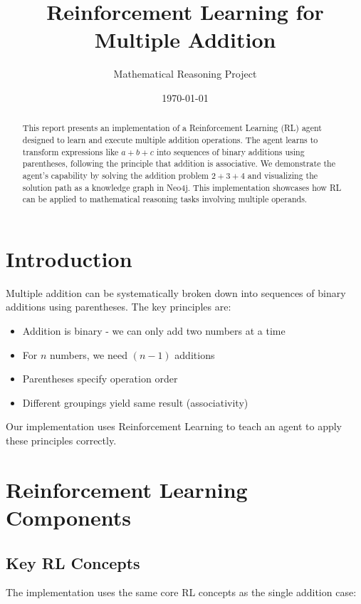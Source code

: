 \documentclass{article}
\title{Reinforcement Learning for Multiple Addition}
\author{Mathematical Reasoning Project}
\date{\today}
\begin{document}
\maketitle

\begin{abstract}
    This report presents an implementation of a Reinforcement Learning (RL) agent designed to learn and execute multiple addition operations. The agent learns to transform expressions like $a + b + c$ into sequences of binary additions using parentheses, following the principle that addition is associative. We demonstrate the agent's capability by solving the addition problem $2 + 3 + 4$ and visualizing the solution path as a knowledge graph in Neo4j. This implementation showcases how RL can be applied to mathematical reasoning tasks involving multiple operands.
\end{abstract}

\section{Introduction}

Multiple addition can be systematically broken down into sequences of binary additions using parentheses. The key principles are:

\begin{itemize}
    \item Addition is binary - we can only add two numbers at a time
    \item For $n$ numbers, we need $(n-1)$ additions
    \item Parentheses specify operation order
    \item Different groupings yield same result (associativity)
\end{itemize}

Our implementation uses Reinforcement Learning to teach an agent to apply these principles correctly.

\section{Reinforcement Learning Components}

\subsection{Key RL Concepts}

The implementation uses the same core RL concepts as the single addition case:
\end{document}
